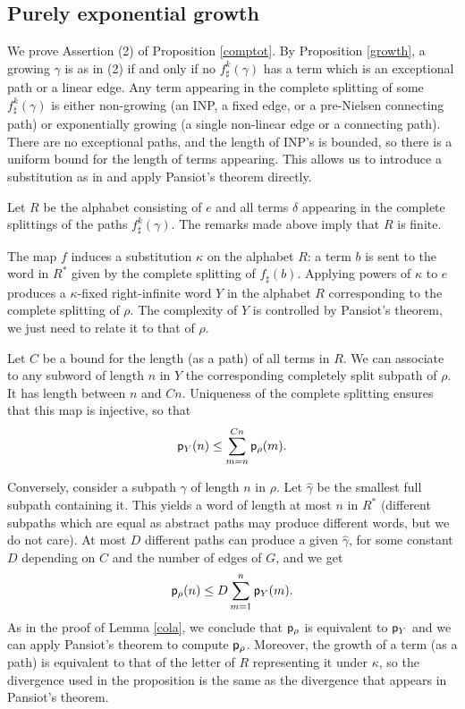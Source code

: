 \documentclass[11pt]{amsart}
\theoremstyle{remark}
\newcommand{\cp}{{\sf  p}}
\begin{document}
\subsection{Purely exponential growth} \label{lbd}


  We prove Assertion (2) of Proposition \ref{comptot}.
 By Proposition \ref{growth}, a growing $\gamma$ is as in (2) if and only if no $f^k_\sharp(\gamma)$ has a term which is an exceptional path or a linear edge. Any term appearing in the complete splitting of some $f^k_\sharp(\gamma)$ is either non-growing (an INP, a fixed edge, or a  pre-Nielsen connecting path) or exponentially growing (a single non-linear edge or a connecting path). There are no exceptional paths,
and the length of INP's is bounded, so there is a uniform bound for the length of  terms appearing.
This allows us to  
 introduce a substitution as in  \cite{Gup} and apply  Pansiot's theorem directly.

Let $R$ be the alphabet consisting of $e$ and all terms $\delta$ appearing in the complete splittings of the paths $f^k_\sharp(\gamma)$.  
 The remarks made above imply that $R$ is finite.

The map $f$ induces a substitution $\kappa$ on the alphabet $R$: a term $b$ is sent to the word in $R^*$ given by the complete splitting of $f_\sharp(b)$. Applying powers of $\kappa$ to $e$ produces a $\kappa$-fixed right-infinite word $Y$  in the alphabet $R$ corresponding to the complete splitting of $\rho$.
The complexity of $Y$ is controlled by Pansiot's theorem, we just need to relate it to that of $\rho$.

Let $C$ be a bound for the length (as a path) of all terms in $R$. We can associate to any subword of length $n$ in $Y$ the corresponding completely split subpath of $\rho$. It has length between $n$ and $Cn$. Uniqueness of the complete splitting ensures that this map is injective, so that $$\cp_Y(n)\le\sum_{m=n}^{Cn}\cp_\rho(m).$$

Conversely, consider a subpath $\gamma$ of length $n$ in $\rho$. Let $\hat \gamma$ be the smallest full subpath containing it. This yields a word of length at most $n$ in $R^*$ (different subpaths which are equal as abstract paths may produce different  words, but we do not care). At most  $D$ different paths can produce a given $\hat \gamma$, for some constant $D$ depending on $C$ and the number of edges of $G$, and we get
$$\cp_\rho(n)\le D\sum_{m=1}^{n}\cp_Y(m).$$
  As in the proof of Lemma \ref{cola}, we conclude that $\cp_\rho$ is equivalent to  $\cp_Y$ and we can apply Pansiot's theorem to compute $\cp_\rho$. Moreover, the growth of a term (as a path) is equivalent to  that of the letter of $R$  representing it under $\kappa$, so the divergence used in the proposition  is the same as the divergence that appears in Pansiot's theorem.
\end{document}
